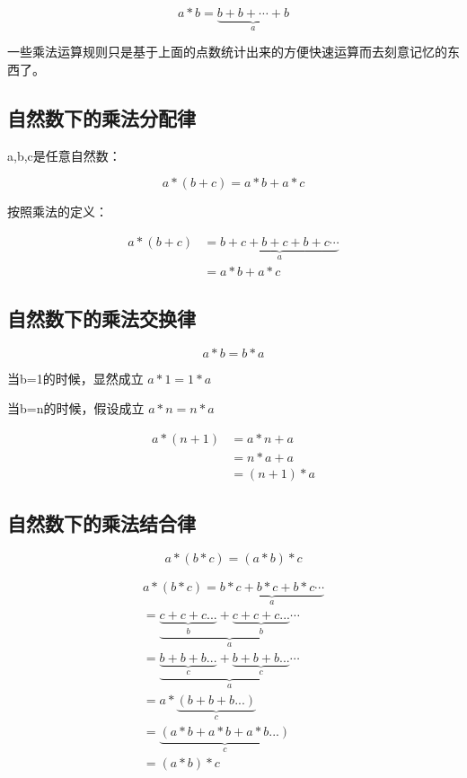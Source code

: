 \documentclass[12pt,oneside]{book}
\begin{document}
\begin{equation}
a * b = \underbrace{ b+b+\cdots+b }_{a}
\end{equation}

一些乘法运算规则只是基于上面的点数统计出来的方便快速运算而去刻意记忆的东西了。


\subsection{自然数下的乘法分配律}
a,b,c是任意自然数：

\begin{equation}
a*(b + c) = a*b + a*c
\end{equation}

按照乘法的定义：

\begin{align*}
a*(b+c) &= \underbrace{b+c + b+ c + b +c \cdots}_a\\
&=a*b + a*c
\end{align*}



\subsection{自然数下的乘法交换律}
\begin{equation}
a * b = b * a
\end{equation}

当b=1的时候，显然成立 $a*1 = 1*a$

当b=n的时候，假设成立 $a*n=n*a$

\begin{align*}
a*(n+1) &= a*n +a \\
&=n*a +a\\
&=(n+1)*a
\end{align*}


\subsection{自然数下的乘法结合律}
\begin{equation}
a * (b * c) = (a * b) * c
\end{equation}

\begin{align*}
a * (b * c) = \underbrace{b*c + b*c + b*c \cdots}_a\\
=\underbrace{\underbrace{c + c +c ...}_b +  \underbrace{c + c +c ...}_b \cdots}_a\\
=\underbrace{\underbrace{b + b +b ...}_c +  \underbrace{b + b +b ...}_c \cdots}_a\\
=a *\underbrace{(b + b +b ...)}_c\\
=\underbrace{(a *b + a *b +a *b ...)}_c\\
=(a*b)*c
\end{align*}
\end{document}
